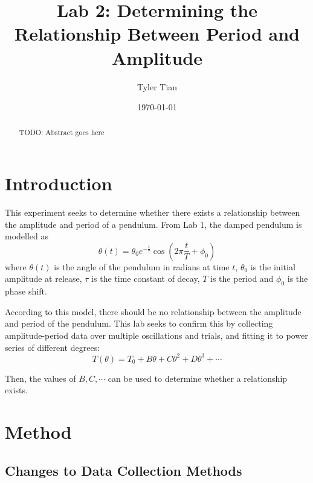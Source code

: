 \documentclass[aps,twocolumn,secnumarabic,nobalancelastpage,amsmath,amssymb,nofootinbib,floatfix]{revtex4}
\begin{document}
\title{Lab 2: Determining the Relationship Between Period and Amplitude}
\author{Tyler Tian}
\date{\today}


\begin{abstract}
TODO: Abstract goes here
\end{abstract}

\maketitle


\section{Introduction}

This experiment seeks to determine whether there exists a relationship between the amplitude and period of a pendulum.
From Lab 1, the damped pendulum is modelled as
\begin{equation}
    \theta(t) = \theta_0 e^{-\frac{t}{\tau}}\cos\left(2\pi\frac{t}{T} + \phi_0\right)
    \label{eqn:model}
\end{equation}
where $\theta(t)$ is the angle of the pendulum in radians at time $t$, $\theta_0$ is the initial amplitude at release,
$\tau$ is the time constant of decay, $T$ is the period and $\phi_0$ is the phase shift.

According to this model, there should be no relationship between the amplitude and period of the pendulum. This lab
seeks to confirm this by collecting amplitude-period data over multiple oscillations and trials, and fitting it to power
series of different degrees:
\begin{equation}
    T(\theta) = T_0 + B\theta + C\theta^2 + D\theta^3 + \cdots
    \label{eqn:power_series}
\end{equation}

Then, the values of $B, C, \cdots$ can be used to determine whether a relationship exists.


\section{Method}

\subsection{Changes to Data Collection Methods}
\end{document}
